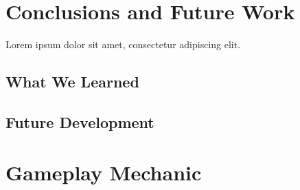 \documentclass[conference]{IEEEtran}
\begin{document}
\section{Conclusions and Future Work}

Lorem ipsum dolor sit amet, consectetur adipiscing elit.

\subsection{What We Learned}

\subsection{Future Development}

\appendices%
\section{Gameplay Mechanic}\label{app:gameplay}




\end{document}
